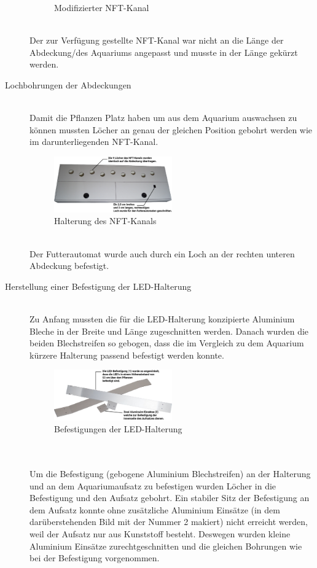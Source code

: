 \begin{description}
\begin{figure}[ht]
	    \caption{Modifizierter \gls{NFT}-Kanal}
    \end{figure}\\
    Der zur Verfügung gestellte \gls{NFT}-Kanal war nicht an die Länge der Abdeckung/des Aquariums angepasst und musste in der Länge gekürzt werden.\\
    \item [Lochbohrungen der Abdeckungen]\mbox{} \\
    Damit die Pflanzen Platz haben um aus dem Aquarium auswachsen zu können mussten Löcher an genau der gleichen Position gebohrt werden wie im darunterliegenden \gls{NFT}-Kanal.\mbox{} \\
    \begin{figure}[ht]
        \centering
        \includegraphics[width=0.5\textwidth]{images/Aufsatz_komplett_Mod}
	    \caption{Halterung des \gls{NFT}-Kanals}
    \end{figure}\\
    Der Futterautomat wurde auch durch ein Loch an der rechten unteren Abdeckung befestigt.
    \item [Herstellung einer Befestigung der LED-Halterung]\mbox{} \\
    Zu Anfang mussten die für die \gls{LED}-Halterung konzipierte Aluminium Bleche in der Breite und Länge zugeschnitten werden. Danach wurden die beiden Blechstreifen so gebogen, dass die im Vergleich zu dem Aquarium kürzere Halterung passend befestigt werden konnte.\mbox{} \\
    \begin{figure}[ht]
        \centering
        \includegraphics[width=0.5\textwidth]{images/LED_Befestigung}
	    \caption{Befestigungen der LED-Halterung}
    \end{figure}\\
    \mbox{} \\
    Um die Befestigung (gebogene Aluminium Blechstreifen) an der Halterung und an dem Aquariumaufsatz zu befestigen wurden Löcher in die Befestigung und den Aufsatz gebohrt. Ein stabiler Sitz der Befestigung an dem Aufsatz konnte ohne zusätzliche Aluminium Einsätze (in dem darüberstehenden Bild mit der Nummer 2 makiert) nicht erreicht werden, weil der Aufsatz nur aus Kunststoff besteht. Deswegen wurden kleine Aluminium Einsätze zurechtgeschnitten und die gleichen Bohrungen wie bei der Befestigung vorgenommen.\mbox\\

\end{description}
